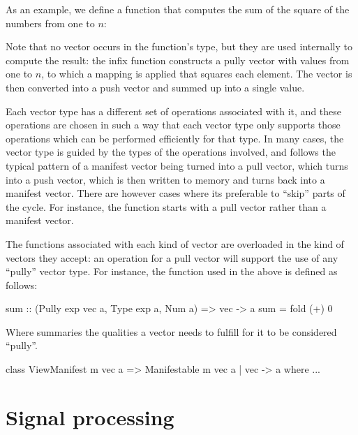 \documentclass[../paper.tex]{subfiles}
\begin{document}
As an example, we define a function that computes the sum of the square of the numbers from one to $n$:


\noindent Note that no vector occurs in the function's type, but they are used internally to compute the result: the infix function  constructs a pully vector with values from one to $n$, to which a mapping is applied that squares each element. The vector is then converted into a push vector and summed up into a single value.

Each vector type has a different set of operations associated with it, and these operations are chosen in such a way that each vector type only supports those operations which can be performed efficiently for that type. In many cases, the vector type is guided by the types of the operations involved, and follows the typical pattern of a manifest vector being turned into a pull vector, which turns into a push vector, which is then written to memory and turns back into a manifest vector. There are however cases where its preferable to ``skip'' parts of the cycle. For instance, the  function starts with a pull vector rather than a manifest vector.

The functions associated with each kind of vector are overloaded in the kind of vectors they accept: an operation for a pull vector will support the use of any ``pully'' vector type. For instance, the  function used in the above  is defined as follows:

\begin{code}
sum :: (Pully exp vec a, Type exp a, Num a) => vec -> a
sum = fold (+) 0
\end{code}

\noindent Where  summaries the qualities a vector needs to fulfill for it to be considered ``pully''.

\begin{code}
class ViewManifest m vec a => Manifestable m vec a | vec -> a where ...
\end{code}

\section{Signal processing}
\end{document}
